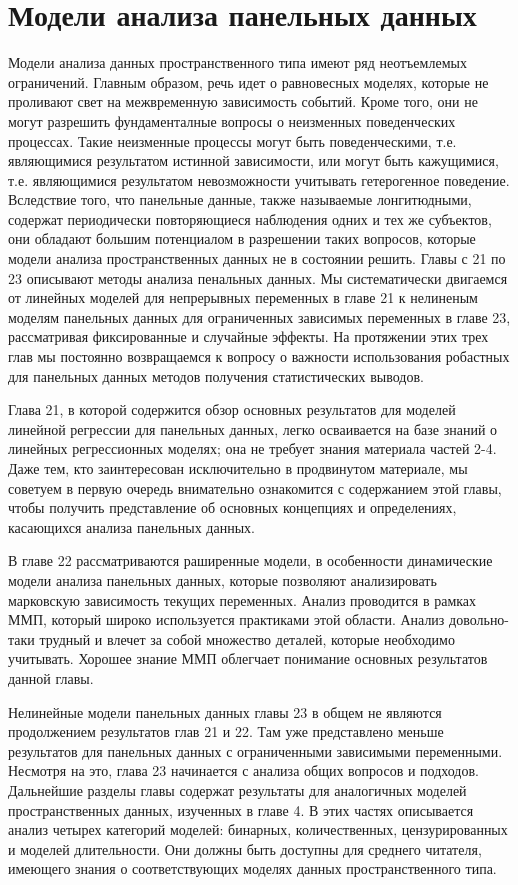 


\part{Модели анализа панельных данных}


Модели анализа данных пространственного типа имеют ряд неотъемлемых ограничений.  Главным образом, речь идет о равновесных моделях, которые не проливают свет на межвременную зависимость событий. Кроме того, они не могут разрешить фундаменталные вопросы о неизменных поведенческих процессах. Такие неизменные процессы могут быть поведенческими, т.е. являющимися результатом истинной зависимости, или могут быть кажущимися, т.е. являющимися результатом невозможности учитывать гетерогенное поведение. Вследствие того, что панельные данные, также называемые лонгитюдными, содержат периодически повторяющиеся наблюдения одних и тех же субъектов, они обладают большим потенциалом в разрешении таких вопросов, которые модели анализа пространственных данных не в состоянии решить.
Главы с 21 по 23 описывают методы анализа пенальных данных. Мы систематически двигаемся от линейных моделей для непрерывных переменных в главе 21 к нелиненым моделям панельных данных для ограниченных зависимых переменных в главе 23, рассматривая фиксированные и случайные эффекты. На протяжении этих трех глав 
мы постоянно возвращаемся к вопросу о важности использования робастных для панельных данных методов получения статистических выводов.

Глава 21, в которой содержится обзор основных результатов для моделей линейной регрессии для панельных данных, легко осваивается на базе знаний о линейных регрессионных моделях; она не требует знания материала частей 2-4. Даже тем, кто заинтересован исключительно в продвинутом материале, мы советуем в первую очередь внимательно ознакомится  с содержанием этой главы, чтобы получить представление об основных концепциях и определениях, касающихся анализа панельных данных.

В главе 22 рассматриваются раширенные модели, в особенности динамические модели анализа панельных данных, которые позволяют анализировать марковскую зависимость текущих переменных. Анализ проводится в рамках ММП, который широко используется практиками этой области. Анализ довольно-таки трудный и влечет за собой множество деталей, которые необходимо учитывать. Хорошее знание ММП облегчает понимание основных результатов данной главы.

Нелинейные модели панельных данных главы 23 в общем не являются продолжением результатов глав 21 и 22. Там уже представлено меньше результатов для панельных данных с ограниченными зависимыми переменными. Несмотря на это, глава 23 начинается с анализа общих вопросов и подходов. Дальнейшие разделы главы содержат результаты для аналогичных моделей пространственных данных, изученных в главе 4. В этих частях описывается анализ четырех категорий моделей: бинарных, количественных, цензурированных и моделей длительности. Они должны быть доступны для среднего читателя, имеющего знания о соответствующих моделях  данных пространственного типа.

